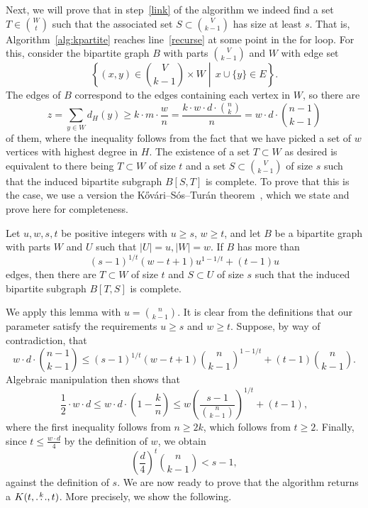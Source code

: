 Next, we will prove that in step~\ref{link} of the algorithm
we indeed find a set $T \in \binom{W}{t}$ such that the associated set
$S \subset \binom{V}{k-1}$ has size at least $s$.
That is, Algorithm~\ref{alg:kpartite} reaches line~\ref{recurse} at some point in the for loop.
For this, consider the bipartite graph $B$ with parts $\binom{V}{k-1}$ and $W$ with edge set
\[
  \left\{(x, y) \in \binom{V}{k-1} \times W \middle| \, x \cup \{y\} \in E \right\}.
\]
The edges of $B$ correspond to the edges containing each vertex in $W$, so there are
\[
    z = \sum_{y \in W} d_H(y) \geq k \cdot m \cdot \frac{w}{n} = \frac{k \cdot w \cdot d \cdot \binom{n}{k}}{n} = w \cdot d \cdot \binom{n - 1}{k-1}
\]
of them, where the inequality follows from the fact that we have picked a set of $w$ vertices with highest degree in $H$.
The existence of a set $T \subset W$ as desired is equivalent to there being $T \subset W$ of size $t$ and a set $S \subset \binom{V}{k-1}$ of size $s$
such that the induced bipartite subgraph $B[S, T]$ is complete.
To prove that this is the case,
we use a version the Kőv\'{a}ri–S\'{o}s–Tur\'{a}n theorem~\cite{Kovari1954},
which we state and prove here for completeness.

\begin{lemma}\label{thm:kst}
    Let $u, w, s, t$ be positive integers with $u \geq s$, $w \geq t$, and let $B$ be a bipartite graph with parts $W$ and $U$ such that
    $|U| = u, |W| = w$.
    If $B$ has more than \[(s - 1)^{1 / t}(w - t + 1)u^{1 - 1 / t} + (t - 1)u\] edges, then there are
    $T \subset W$ of size $t$ and $S \subset U$ of size $s$ such that the induced bipartite subgraph $B[T, S]$ is complete.
\end{lemma}

We apply this lemma with $u = \binom{n}{k-1}$.
It is clear from the definitions that our parameter satisfy the requirements $u \geq s$ and $w \geq t$.
Suppose, by way of contradiction, that
\[
    w \cdot d \cdot \binom{n - 1}{k-1} \leq (s - 1)^{1 / t}(w - t + 1)\binom{n}{k-1}^{1 - 1 / t} + (t - 1)\binom{n}{k-1}.
\]
Algebraic manipulation then shows that
\[
    \frac{1}{2} \cdot w \cdot d
    \leq w \cdot d \cdot \left( 1 - \frac{k}{n} \right)
    \leq w \left( \frac{s-1}{\binom{n}{k-1} } \right)^{1 / t} + (t - 1),
\]
where the first inequality follows from $n \geq 2k$, which follows from $t \geq 2$. %
Finally, since $t \leq \frac{w \cdot d}{4}$ by the definition of $w$, we obtain
\[
    \left( \frac{d}{4}\right)^t \binom{n}{k-1} < s-1,
\]
against the definition of $s$.
We are now ready to prove that the algorithm returns a $K(t, \overset{k}{\dots}, t)$.
More precisely, we show the following.

